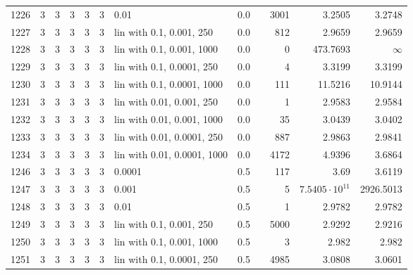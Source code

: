 \begin{longtable}{lrrrrrlrrrrr}
 1226 &       3 & 3 & 3 & 3 & 3 &                        0.01 &      0.0 &        &    3001 &                 3.2505 &                 3.2748 \\
 1227 &       3 & 3 & 3 & 3 & 3 &    lin with 0.1, 0.001, 250 &      0.0 &        &     812 &                 2.9659 &                 2.9659 \\
 1228 &       3 & 3 & 3 & 3 & 3 &   lin with 0.1, 0.001, 1000 &      0.0 &        &       0 &               473.7693 &               $\infty$ \\
 1229 &       3 & 3 & 3 & 3 & 3 &   lin with 0.1, 0.0001, 250 &      0.0 &        &       4 &                 3.3199 &                 3.3199 \\
 1230 &       3 & 3 & 3 & 3 & 3 &  lin with 0.1, 0.0001, 1000 &      0.0 &        &     111 &                11.5216 &                10.9144 \\
 1231 &       3 & 3 & 3 & 3 & 3 &   lin with 0.01, 0.001, 250 &      0.0 &        &       1 &                 2.9583 &                 2.9584 \\
 1232 &       3 & 3 & 3 & 3 & 3 &  lin with 0.01, 0.001, 1000 &      0.0 &        &      35 &                 3.0439 &                 3.0402 \\
 1233 &       3 & 3 & 3 & 3 & 3 &  lin with 0.01, 0.0001, 250 &      0.0 &        &     887 &                 2.9863 &                 2.9841 \\
 1234 &       3 & 3 & 3 & 3 & 3 & lin with 0.01, 0.0001, 1000 &      0.0 &        &    4172 &                 4.9396 &                 3.6864 \\
 1246 &       3 & 3 & 3 & 3 & 3 &                      0.0001 &      0.5 &        &     117 &                   3.69 &                 3.6119 \\
 1247 &       3 & 3 & 3 & 3 & 3 &                       0.001 &      0.5 &        &       5 &  $7.5405\cdot 10^{11}$ &              2926.5013 \\
 1248 &       3 & 3 & 3 & 3 & 3 &                        0.01 &      0.5 &        &       1 &                 2.9782 &                 2.9782 \\
 1249 &       3 & 3 & 3 & 3 & 3 &    lin with 0.1, 0.001, 250 &      0.5 &        &    5000 &                 2.9292 &                 2.9216 \\
 1250 &       3 & 3 & 3 & 3 & 3 &   lin with 0.1, 0.001, 1000 &      0.5 &        &       3 &                  2.982 &                  2.982 \\
 1251 &       3 & 3 & 3 & 3 & 3 &   lin with 0.1, 0.0001, 250 &      0.5 &        &    4985 &                 3.0808 &                 3.0601 \\

\end{longtable}
